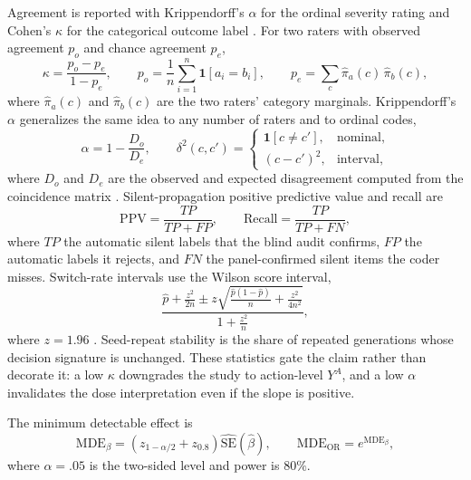 \documentclass[a4paper,fleqn]{cas-sc}
\begin{document}
Agreement is reported with Krippendorff's $\alpha$ for the ordinal severity rating
\cite{krippendorff,hayes2007} and Cohen's $\kappa$ for the categorical outcome label
\cite{cohen1960,landis1977}.
For two raters with observed agreement $p_o$ and chance agreement $p_e$,
\begin{equation}
  \kappa=\frac{p_o-p_e}{1-p_e},
  \qquad
  p_o=\frac{1}{n}\sum_{i=1}^{n}\mathbf{1}[a_i=b_i],
  \qquad
  p_e=\sum_{c}\hat\pi_a(c)\,\hat\pi_b(c),
  \label{eq:kappa}
\end{equation}
where $\hat\pi_a(c)$ and $\hat\pi_b(c)$ are the two raters' category marginals. Krippendorff's
$\alpha$ generalizes the same idea to any number of raters and to ordinal codes,
\begin{equation}
  \alpha=1-\frac{D_o}{D_e},
  \qquad
  \delta^{2}(c,c')=
  \begin{cases}
    \mathbf{1}[c\neq c'], & \text{nominal},\\
    (c-c')^{2}, & \text{interval},
  \end{cases}
  \label{eq:alpha}
\end{equation}
where $D_o$ and $D_e$ are the observed and expected disagreement computed from the coincidence
matrix \cite{krippendorff}. Silent-propagation positive predictive value and recall are
\begin{equation}
  \mathrm{PPV}=\frac{TP}{TP+FP},
  \qquad
  \mathrm{Recall}=\frac{TP}{TP+FN},
  \label{eq:ppv}
\end{equation}
where $TP$ the automatic silent labels that the blind audit confirms, $FP$ the automatic labels it
rejects, and $FN$ the panel-confirmed silent items the coder misses. Switch-rate intervals use the
Wilson score interval,
\begin{equation}
  \frac{\hat p+\frac{z^{2}}{2n}\pm
        z\sqrt{\frac{\hat p(1-\hat p)}{n}+\frac{z^{2}}{4n^{2}}}}
       {1+\frac{z^{2}}{n}},
  \label{eq:wilson}
\end{equation}
where $z=1.96$ \cite{wilson1927}. Seed-repeat stability is the share of repeated generations whose decision signature is
unchanged. These statistics gate the claim rather than decorate it: a low $\kappa$ downgrades the
study to action-level $Y^{A}$, and a low $\alpha$ invalidates the dose interpretation even if the
slope is positive.

The minimum detectable effect is
\begin{equation}
  \mathrm{MDE}_{\beta}=
  \left(z_{1-\alpha/2}+z_{0.8}\right)\widehat{\mathrm{SE}}(\hat\beta),
  \qquad
  \mathrm{MDE}_{\mathrm{OR}}=e^{\mathrm{MDE}_{\beta}},
  \label{eq:mde}
\end{equation}
where $\alpha=.05$ is the two-sided level and power is $80\%$.
\end{document}
